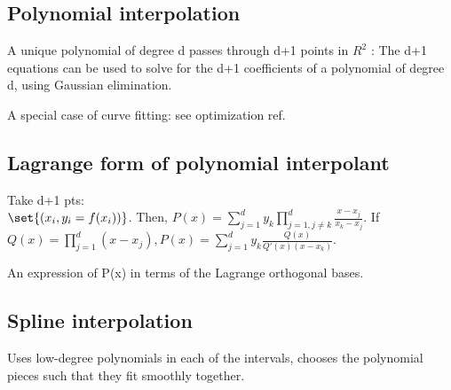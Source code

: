 \documentclass[10pt]{amsart}
\begin{document}
\subsection{Polynomial interpolation}
A unique polynomial of degree d passes through d+1 points in $R^2$ : The d+1 equations can be used to solve for the d+1 coefficients of a polynomial of degree d, using Gaussian elimination.

A special case of curve fitting: see optimization ref.

\subsection{Lagrange form of polynomial interpolant}
Take d+1 pts: \\
$\set{(x_{i}, y_{i} = f(x_{i}))}$. Then, $P(x) = \sum_{j=1}^{d}y_{k}\prod_{j=1, j\neq k}^{d}\frac{x - x_{j}}{x_{k} - x_{j}}$. If $Q(x) = \prod_{j=1}^{d}(x-x_{j}), P(x) = \sum_{j=1}^{d}y_{k}\frac{Q(x)}{Q'(x)(x - x_{k})}$.

An expression of P(x) in terms of the Lagrange orthogonal bases.

\subsection{Spline interpolation}
Uses low-degree polynomials in each of the intervals, chooses the polynomial pieces such that they fit smoothly together.



%
%
\end{document}
